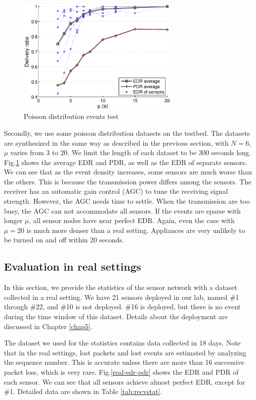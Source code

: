 \begin{figure}[htb]
  \centering
  \includegraphics[width=0.7\textwidth]{../../sw/pc/matlab/testbed-result/poisson-5min}
  \caption{Poisson distribution events test}
  \label{fig:poisson-5min}
\end{figure}

Secondly, we use some poisson distribution datasets on the testbed. The datasets are synthesized in the same way as described in the previous section, with $N = 6$, $\mu$ varies from 3 to 20. We limit the length of each dataset to be 300 seconds long. Fig.\ref{fig:poisson-5min} shows the average EDR and PDR, as well as the EDR of separate sensors. We can see that as the event density increases, some sensors are much worse than the others. This is because the transmission power differs among the sensors. The receiver has an automatic gain control (AGC) to tune the receiving signal strength. However, the AGC needs time to settle. When the transmission are too busy, the AGC can not accommodate all sensors. If the events are sparse with longer $\mu$, all sensor nodes have near perfect EDR. Again, even the case with $\mu=20$ is much more denser than a real setting. Appliances are very unlikely to be turned on and off within 20 seconds. 

\subsection{Evaluation in real settings}

In this section, we provide the statistics of the sensor network with a dataset collected in a real setting. We have 21 sensors deployed in our lab, named \#1 through \#22, and \#10 is not deployed. \#16 is deployed, but there is no event during the time window of this dataset. Details about the deployment are discussed in Chapter \ref{chap5}.

The dataset we used for the statistics contains data collected in 18 days. Note that in the real settings, lost packets and lost events are estimated by analyzing the sequence number. This is accurate unless there are more than 16 successive packet loss, which is very rare. Fig.\ref{real-edr-pdr} shows the EDR and PDR of each sensor. We can see that  all sensors achieve almost perfect EDR, except for \#1. Detailed data are shown in Table \ref{tab:recvstat}.

